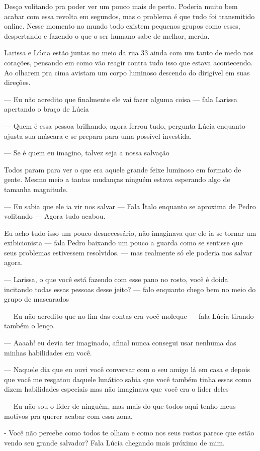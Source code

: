 Desço volitando pra poder ver um pouco mais de perto. Poderia muito bem acabar com essa revolta em segundos, mas o problema é que tudo foi transmitido online. Nesse momento no mundo todo existem pequenos grupos como esses, despertando e fazendo o que o ser humano sabe de melhor, merda.

Larissa e Lúcia estão juntas no meio da rua 33 ainda com um tanto de medo nos corações, pensando em como vão reagir contra tudo isso que estava acontecendo. Ao olharem pra cima avistam um corpo luminoso descendo do dirigível em suas direções.

— Eu não acredito que finalmente ele vai fazer alguma coisa — fala Larissa apertando o braço de Lúcia

— Quem é essa pessoa brilhando, agora ferrou tudo, pergunta Lúcia enquanto ajusta sua máscara e se prepara para uma possível investida.

— Se é quem eu imagino, talvez seja a nossa salvação

Todos param para ver o que era aquele grande feixe luminoso em formato de gente. Mesmo meio a tantas mudanças ninguém estava esperando algo de tamanha magnitude.

— Eu sabia que ele ia vir nos salvar — Fala Ítalo enquanto se aproxima de Pedro volitando — Agora tudo acabou.

Eu acho tudo isso um pouco desnecessário, não imaginava que ele ia se tornar um exibicionista — fala Pedro baixando um pouco a guarda como se sentisse que seus problemas estivessem resolvidos. — mas realmente só ele poderia nos salvar agora.

— Larissa, o que você está fazendo com esse pano no rosto, você é doida incitando todas essas pessoas desse jeito? — falo enquanto chego bem no meio do grupo de mascarados

— Eu não acredito que no fim das contas era você moleque — fala Lúcia tirando também o lenço.

— Aaaah! eu devia ter imaginado, afinal nunca consegui usar nenhuma das minhas habilidades em você.

— Naquele dia que eu ouvi você conversar com o seu amigo lá em casa e depois que você me resgatou daquele lunático sabia que você também tinha essas como dizem habilidades especiais mas não imaginava que você era o líder deles

— Eu não sou o líder de ninguém, mas mais do que todos aqui tenho meus motivos pra querer acabar com essa zona.

- Você não percebe como todos te olham e como nos seus rostos parece que estão vendo seu grande salvador? Fala Lúcia chegando mais próximo de mim.


